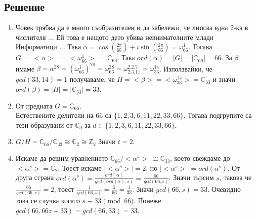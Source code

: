 \documentclass[12pt]{article}
\begin{document}
\subsection{Решение}
\begin{enumerate}[label=\alph*)]
    \item Човек трябва да е много съобразителен и да забележи, че липсва една 2-ка в числителя ... Ей това е нещото дето убива невнимателните млади Информатици ...
    Така \(\alpha = \cos\left(\displaystyle\frac{2\pi}{66}\right) + i\sin\left(\displaystyle\frac{2\pi}{66}\right) = \omega_{66}^1\).
    Тогава \(G = \; <\alpha> \; = \; <\omega_{66}^1> \; = \mathbb{C}_{66}\).
    Така \(ord(\alpha) = |G| = |\mathbb{C}_{66}| = 66\).
    За \(\beta\) имаме \(\beta = \alpha^{28} = (\omega_{66}^1)^{28} = \omega_{66}^{28} = \omega_{2.3.11}^{2.2.7} = \omega_{33}^{14}\). Използвайки, че \(gcd(33, 14) = 1\) получаваме, че \(H = <\beta> = <\omega_{33}^{14}> = \mathbb{C}_{33}\) и значи
    \(ord(\beta) = |H| = |\mathbb{C}_{33}| = 33\).
    \item От предната \(G = \mathbb{C}_{66}\). \\
    Естествените делители на \(66\) са \(\{1, 2, 3, 6, 11, 22, 33, 66\}\).
    Тогава подгрупите са тези образувани от \(\mathbb{C}_d\) за \(d \in \{1, 2, 3, 6, 11, 22, 33, 66\}\).
    \item \(G / H = \mathbb{C}_{66} / \mathbb{C}_{33} \cong \mathbb{C}_{2} \cong \mathbb{Z}_2\) Значи \(t = 2\).
    \item Искаме да решим уравнението \(\mathbb{C}_{66} / <\alpha^s> \; \cong \mathbb{C}_{33}\), което свеждаме до \(<\alpha^s> = \mathbb{C}_{2}\).
    Тоест искаме \(|<\alpha^s>| = 2\), но \(|<\alpha^s>| = ord(\alpha^s)\).
    От друга страна \(ord(\alpha^s) = \displaystyle\frac{ord(\alpha)}{gcd(ord(\alpha), s)} = \displaystyle\frac{66}{gcd(66, s)}\). Значи търсим \(s\), такова че
    \(\displaystyle\frac{66}{gcd(66, s)} = 2\), тоест \(\displaystyle\frac{1}{gcd(66, s)} = \displaystyle\frac{2}{66} = \displaystyle\frac{1}{33}\). Значи \(gcd(66, s) = 33\).
    Очевидно това се случва когато \(s \equiv 33 \pmod{66}\). Понеже \(gcd(66, 66z + 33) = gcd(66, 33) = 33\).
\end{enumerate}
\end{document}
